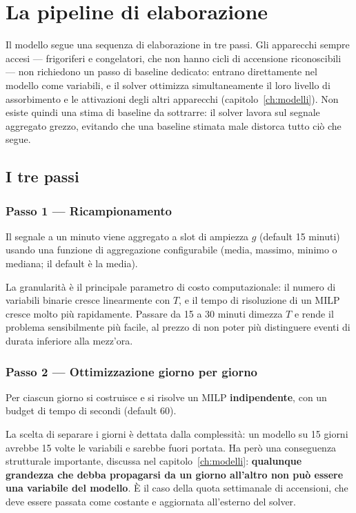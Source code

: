 \chapter{La pipeline di elaborazione}
\label{ch:pipeline}

Il modello segue una sequenza di elaborazione in tre passi. Gli apparecchi sempre accesi
--- frigoriferi e congelatori, che non hanno cicli di accensione riconoscibili --- non richiedono
un passo di baseline dedicato: entrano direttamente nel modello come variabili, e il solver
ottimizza simultaneamente il loro livello di assorbimento e le attivazioni degli altri apparecchi
(capitolo~\ref{ch:modelli}). Non esiste quindi una stima di baseline da sottrarre: il solver lavora
sul segnale aggregato grezzo, evitando che una baseline stimata male distorca tutto ciò che segue.

\section{I tre passi}

\subsection*{Passo 1 --- Ricampionamento}

Il segnale a un minuto viene aggregato a slot di ampiezza $g$ (default 15 minuti) usando una
funzione di aggregazione configurabile (media, massimo, minimo o mediana; il default è la media).

La granularità è il principale parametro di costo computazionale: il numero di variabili binarie
cresce linearmente con $T$, e il tempo di risoluzione di un MILP cresce molto più rapidamente.
Passare da 15 a 30 minuti dimezza $T$ e rende il problema sensibilmente più facile, al prezzo di
non poter più distinguere eventi di durata inferiore alla mezz'ora.

\subsection*{Passo 2 --- Ottimizzazione giorno per giorno}

Per ciascun giorno si costruisce e si risolve un MILP \textbf{indipendente}, con un budget di
tempo di  secondi (default 60).

La scelta di separare i giorni è dettata dalla complessità: un modello su 15 giorni avrebbe 15
volte le variabili e sarebbe fuori portata. Ha però una conseguenza strutturale importante,
discussa nel capitolo~\ref{ch:modelli}: \textbf{qualunque grandezza che debba propagarsi da un
giorno all'altro non può essere una variabile del modello}. È il caso della quota settimanale di
accensioni, che deve essere passata come costante e aggiornata all'esterno del solver.

